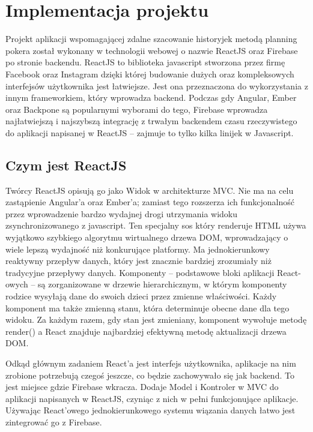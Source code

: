
\chapter{Implementacja projektu}

Projekt aplikacji wspomagającej zdalne szacowanie historyjek metodą planning pokera został wykonany w technologii webowej o nazwie ReactJS oraz Firebase po stronie backendu. ReactJS to biblioteka javascript stworzona przez firmę Facebook oraz Instagram dzięki której budowanie dużych oraz kompleksowych interfejsów użytkownika jest łatwiejsze. Jest ona przeznaczona do wykorzystania z innym frameworkiem, który wprowadza backend. Podczas gdy Angular, Ember oraz Backpone są popularnymi wyborami do tego, Firebase wprowadza najłatwiejszą i najszybszą integrację z trwałym backendem czasu rzeczywistego do aplikacji napisanej w ReactJS – zajmuje to tylko kilka linijek w Javascript. 

\section{Czym jest ReactJS}

Twórcy ReactJS opisują go jako Widok w architekturze MVC. Nie ma na celu zastąpienie Angular’a oraz Ember’a; zamiast tego rozszerza ich funkcjonalność przez wprowadzenie bardzo wydajnej drogi utrzymania widoku zsynchronizowanego z javascript. Ten specjalny sos który renderuje HTML używa wyjątkowo szybkiego algorytmu wirtualnego drzewa DOM, wprowadzający o wiele lepszą wydajność niż konkurujące platformy. Ma jednokierunkowy reaktywny przepływ danych, który jest znacznie bardziej zrozumiały niż tradycyjne przepływy danych. Komponenty – podstawowe bloki aplikacji React-owych – są zorganizowane w drzewie hierarchicznym, w którym komponenty rodzice wysyłają dane do swoich dzieci przez zmienne właściwości. Każdy komponent ma także zmienną stanu, która determinuje obecne dane dla tego widoku. Za każdym razem, gdy stan jest zmieniany, komponent wywołuje metodę render() a React znajduje najbardziej efektywną metodę aktualizacji drzewa DOM.

Odkąd głównym zadaniem React’a jest interfejs użytkownika, aplikacje na nim zrobione potrzebują czegoś jeszcze, co będzie zachowywało się jak backend. To jest miejsce gdzie Firebase wkracza. Dodaje Model i Kontroler w MVC do aplikacji napisanych w ReactJS, czyniąc z nich w pełni funkcjonujące aplikacje. Używając React’owego jednokierunkowego systemu wiązania danych łatwo jest zintegrować go z Firebase.\cite{www_react}


